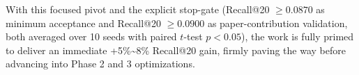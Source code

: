 \documentclass[12pt, a4paper]{article}
\begin{document}
With this focused pivot and the explicit stop-gate (Recall@20 $\geq 0.0870$ as minimum acceptance and Recall@20 $\geq 0.0900$ as paper-contribution validation, both averaged over 10 seeds with paired $t$-test $p < 0.05$), the work is fully primed to deliver an immediate +5\%\textasciitilde8\% Recall@20 gain, firmly paving the way before advancing into Phase 2 and 3 optimizations.
\end{document}
